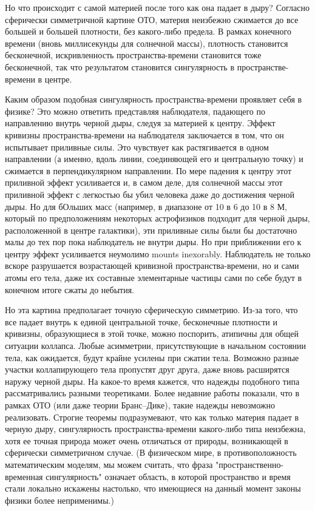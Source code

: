 \documentclass[a4paper, 10pt, twocolumn]{article}
\def\q#1{{\color{red} #1}}
\begin{document}
Но что происходит с самой материей после того как она падает в дыру? 
Согласно сферически симметричной картине ОТО, материя неизбежно 
сжимается до все большей и большей плотности, без какого-либо предела. 
В рамках конечного времени (вновь миллисекунды для солнечной массы), 
плотность становится бесконечной, искривленность пространства-времени 
становится тоже бесконечной, так что результатом становится 
сингулярность в пространстве-времени в центре.

Каким образом подобная сингулярность пространства-времени проявляет себя 
в физике? Это можно ответить представляя наблюдателя, падающего по 
направлению внутрь черной дыры, следуя за материей к центру. Эффект 
кривизны пространства-времени на наблюдателя заключается в том, что он 
испытывает приливные силы. Это чувствует как растягивается в одном 
направлении (а именно, вдоль линии, соединяющей его и центральную точку) 
и сжимается в перпендикулярном направлении. По мере падения к центру 
этот приливной эффект усиливается и, в самом деле, для солнечной массы 
этот приливной эффект с легкостью бы убил человека даже до достижения 
черной дыры. Но для бОльших масс (например, в диапазоне от 10 в 6 до 10 
в 8 М, который по предположениям некоторых астрофизиков подходит для 
черной дыры, расположенной в центре галактики), эти приливные силы были 
бы достаточно малы до тех пор пока наблюдатель не внутри дыры. Но при 
приближении его к центру эффект усиливается неумолимо \q{mounts 
inexorably}. Наблюдатель не только вскоре разрушается возрастающей 
кривизной пространства-времени, но и сами атомы его тела, даже их 
составные элементарные частицы сами по себе будут в конечном итоге сжаты 
до небытия.

Но эта картина предполагает точную сферическую симметрию. Из-за того, 
что все падает внутрь к единой центральной точке, бесконечные плотности 
и кривизны, образующиеся в этой точке, можно поспорить, атипичны для 
общей ситуации коллапса. Любые асимметрии, присутствующие в начальном 
состоянии тела, как ожидается, будут крайне усилены при сжатии тела. 
Возможно разные участки коллапирующего тела пропустят друг друга, даже 
вновь расширятся наружу черной дыры. На какое-то время кажется, что 
надежды подобного типа рассматривались разными теоретиками. Более 
недавние работы показали, что в рамках ОТО (или даже теории 
Бранс--Дике), такие надежды невозможно реализовать. Строгие теоремы 
подразумевают, что как только материя падает в черную дыру, 
сингулярность пространства-времени какого-либо типа неизбежна, хотя ее 
точная природа может очень отличаться от природы, возникающей 
в сферически симметричном случае. (В физическом мире, 
в противоположность математическим моделям, мы можем считать, что фраза 
"пространственно-временная сингулярность" означает область, в которой 
пространство и время стали локально искажены настолько, что имеющиеся на 
данный момент законы физики более неприменимы.)
\end{document}
